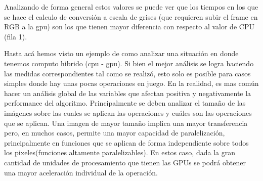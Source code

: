 \documentclass[a4paper,10pt]{report}
\begin{document}

\begin{center}
\end{center}





Analizando de forma general estos valores se puede ver que los tiempos en los que se hace el calculo de conversión a escala de grises (que requieren subir el frame en RGB a la gpu) son los que tienen mayor
diferencia con respecto al valor de CPU (fila 1).



Hasta acá hemos visto un ejemplo de como analizar una situación en donde tenemos computo hibrido (cpu - gpu).
Si bien el mejor análisis se logra haciendo las medidas correspondientes tal como se realizó, esto solo es posible para casos simples donde hay unas pocas operaciones en juego.
En la realidad, es mas común hacer un análisis global de las variables que afectan positiva y negativamente la performance del algoritmo. Principalmente se deben analizar el tamaño de las imágenes sobre las cuales se aplican las operaciones y cuáles son las operaciones que se aplican. 
Una imagen de mayor tamaño implica una mayor transferencia pero, en muchos casos, permite una mayor capacidad de paralelización, principalmente en funciones que se aplican de forma independiente sobre todos los pixeles(funciones altamente paralelizables). 
En estos caso, dada la gran cantidad de unidades de procesamiento que tienen las GPUs se podrá obtener una mayor aceleración individual de la operación.
\end{document}

